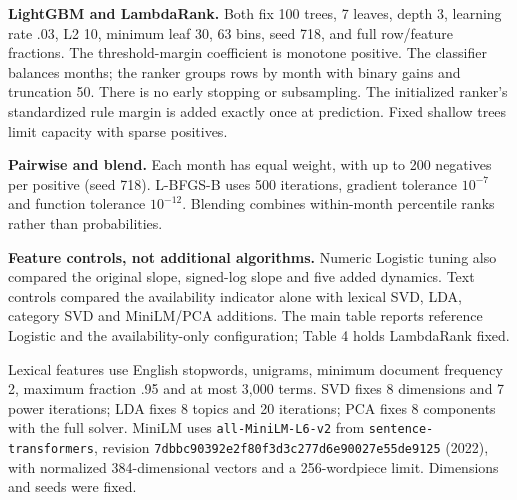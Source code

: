 \documentclass[11pt,letterpaper]{article}
\begin{document}
\textbf{LightGBM and LambdaRank.} Both fix 100 trees, 7 leaves, depth 3, learning rate .03, L2 10, minimum leaf 30, 63 bins, seed 718, and full row/feature fractions. The threshold-margin coefficient is monotone positive. The classifier balances months; the ranker groups rows by month with binary gains and truncation 50. There is no early stopping or subsampling. The initialized ranker's standardized rule margin is added exactly once at prediction. Fixed shallow trees limit capacity with sparse positives.

\textbf{Pairwise and blend.} Each month has equal weight, with up to 200 negatives per positive (seed 718). L-BFGS-B uses 500 iterations, gradient tolerance $10^{-7}$ and function tolerance $10^{-12}$. Blending combines within-month percentile ranks rather than probabilities.

\textbf{Feature controls, not additional algorithms.} Numeric Logistic tuning also compared the original slope, signed-log slope and five added dynamics. Text controls compared the availability indicator alone with lexical SVD, LDA, category SVD and MiniLM/PCA additions. The main table reports reference Logistic and the availability-only configuration; Table 4 holds LambdaRank fixed.

Lexical features use English stopwords, unigrams, minimum document frequency 2, maximum fraction .95 and at most 3,000 terms. SVD fixes 8 dimensions and 7 power iterations; LDA fixes 8 topics and 20 iterations; PCA fixes 8 components with the full solver. MiniLM uses \texttt{all-MiniLM-L6-v2} from \texttt{sentence-transformers}, revision \nolinkurl{7dbbc90392e2f80f3d3c277d6e90027e55de9125} (2022), with normalized 384-dimensional vectors and a 256-wordpiece limit. Dimensions and seeds were fixed.
\end{document}
